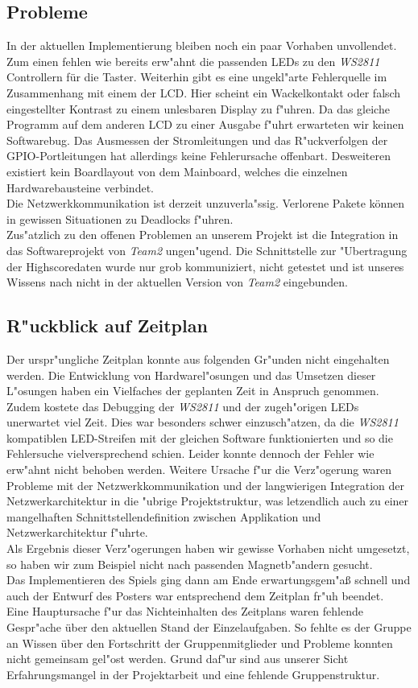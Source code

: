 \documentclass[a4paper]{article}
\begin{document}
  \subsection{Probleme}
  In der aktuellen Implementierung bleiben noch ein paar Vorhaben unvollendet.
  Zum einen fehlen wie bereits erw"ahnt die passenden LEDs zu den
  \textit{WS2811} Controllern für die Taster. Weiterhin gibt es eine
  ungekl"arte Fehlerquelle im Zusammenhang mit einem der LCD. Hier scheint
  ein Wackelkontakt oder falsch eingestellter Kontrast zu einem unlesbaren
  Display zu f"uhren. Da das gleiche Programm auf dem anderen LCD zu einer
  Ausgabe f"uhrt erwarteten wir keinen Softwarebug. Das Ausmessen der
  Stromleitungen und das R"uckverfolgen der GPIO-Portleitungen hat allerdings
  keine Fehlerursache offenbart. Desweiteren existiert kein Boardlayout von dem
  Mainboard, welches die einzelnen Hardwarebausteine verbindet.\\ Die
  Netzwerkkommunikation ist derzeit unzuverla"ssig. Verlorene Pakete können in
  gewissen Situationen zu Deadlocks f"uhren.\\
  Zus"atzlich zu den offenen Problemen an unserem Projekt ist die Integration
  in das Softwareprojekt von \textit{Team2} ungen"ugend. Die Schnittstelle zur
  "Ubertragung der Highscoredaten wurde nur grob kommuniziert, nicht getestet
  und ist unseres Wissens nach nicht in der aktuellen Version von
  \textit{Team2} eingebunden.
  \subsection{R"uckblick auf Zeitplan}
  Der urspr"ungliche Zeitplan konnte aus folgenden Gr"unden nicht eingehalten werden.
  Die Entwicklung von Hardwarel"osungen und das Umsetzen dieser L"osungen haben
  ein Vielfaches der geplanten Zeit in Anspruch genommen. Zudem kostete das
  Debugging der \textit{WS2811} und der zugeh"origen LEDs unerwartet viel Zeit.
  Dies war besonders schwer einzusch"atzen, da die \textit{WS2811} kompatiblen
  LED-Streifen mit der gleichen Software funktionierten und so die Fehlersuche
  vielversprechend schien. Leider konnte dennoch der Fehler wie erw"ahnt nicht
  behoben werden. Weitere Ursache f"ur die Verz"ogerung waren Probleme mit der
  Netzwerkkommunikation und der langwierigen Integration der
  Netzwerkarchitektur in die "ubrige Projektstruktur, was letzendlich auch zu
  einer mangelhaften Schnittstellendefinition zwischen Applikation und
  Netzwerkarchitektur f"uhrte.\\ Als Ergebnis dieser Verz"ogerungen haben wir
  gewisse Vorhaben nicht umgesetzt, so haben wir zum Beispiel nicht nach
  passenden Magnetb"andern gesucht.\\ Das Implementieren des Spiels ging dann
  am Ende erwartungsgem"aß schnell und auch der Entwurf des Posters war
  entsprechend dem Zeitplan fr"uh beendet.\\ Eine Hauptursache f"ur das
  Nichteinhalten des Zeitplans waren fehlende Gespr"ache über den aktuellen
  Stand der Einzelaufgaben. So fehlte es der Gruppe an Wissen über den
  Fortschritt der Gruppenmitglieder und Probleme konnten nicht gemeinsam
  gel"ost werden.  Grund daf"ur sind aus unserer Sicht Erfahrungsmangel in
  der Projektarbeit und eine fehlende Gruppenstruktur.
\end{document}
